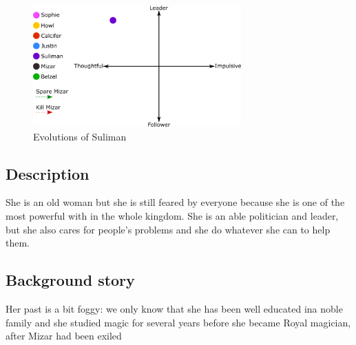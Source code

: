 \begin{figure}
  \centering
   \includegraphics[width=8cm]{Images/Evolutions/sulimanEvolution}
  \caption{Evolutions of Suliman}
\end{figure}

\subsection{Description}
She is an old woman but she is still feared by everyone because she is one of the most powerful with in the whole kingdom. She is an able politician and leader, but she also cares for people's problems and she do whatever she can to help them.
\subsection{Background story}
Her past is a bit foggy: we only know that she has been well educated ina noble family and she studied magic for several years before she became Royal magician, after Mizar had been exiled
